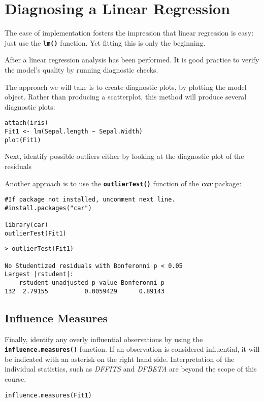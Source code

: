 \documentclass[a4paper,12pt]{article}
\begin{document}
\section{Diagnosing a Linear Regression}
The ease of implementation fosters the impression that linear regression is easy: just use the \texttt{\textbf{lm()}} function. Yet fitting
this is only the beginning.

After a linear regression analysis has been performed. It is good practice to verify the model’s quality
by running diagnostic checks.

The approach we will take is to create diagnostic plots, by plotting the model object. Rather than producing a scatterplot, this method will produce several diagnostic plots:

\begin{framed}
\begin{verbatim}
attach(iris)
Fit1 <- lm(Sepal.length ~ Sepal.Width)
plot(Fit1)
\end{verbatim} 
\end{framed}

Next, identify possible outliers either by looking at the diagnostic plot of the residuals

Another approach is to use the \texttt{\textbf{outlierTest()}} function of the \textit{\textbf{car}} package:


\begin{framed}
\begin{verbatim}
#If package not installed, uncomment next line.
#install.packages("car")

library(car)
outlierTest(Fit1)
\end{verbatim} 
\end{framed}
\begin{verbatim}
> outlierTest(Fit1)

No Studentized residuals with Bonferonni p < 0.05
Largest |rstudent|:
    rstudent unadjusted p-value Bonferonni p
132  2.79155          0.0059429      0.89143

\end{verbatim}
\subsection{Influence Measures}
Finally, identify any overly influential observations by using the \texttt{\textbf{influence.measures()}} 
function.
If an observation is considered influential, it will be indicated with an asterisk on the right hand side. Interpretation of the individual statistics, such as \textit{DFFITS} and \textit{DFBETA} are beyond the scope of this course.

\begin{framed}
\begin{verbatim}
influence.measures(Fit1)
\end{verbatim} 
\end{framed}
\end{document}
